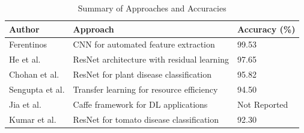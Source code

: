 \documentclass[conference]{IEEEtran}
\begin{document}
\begin{table}[h]
    \centering
    \caption{Summary of Approaches and Accuracies}
    \begin{tabular}{|p{2cm}|p{3cm}|p{1cm}|}
        \hline
        \textbf{Author} & \textbf{Approach} & \textbf{Accuracy (\%)} \\
        \hline
        
        Ferentinos \cite{r4} & CNN for automated feature extraction & 99.53 \\
        He et al.\cite{r2} & ResNet architecture with residual learning & 97.65 \\
        Chohan et al. \cite{r1} & ResNet for plant disease classification & 95.82 \\
        Sengupta et al. \cite{r12} & Transfer learning for resource efficiency & 94.50 \\
        Jia et al. \cite{r8} & Caffe framework for DL applications & Not Reported \\
        Kumar et al.\cite{r5}  & ResNet for tomato disease classification & 92.30 \\
        \hline
    \end{tabular}
    
    \label{tab:approaches_accuracies}
\end{table}
\end{document}
